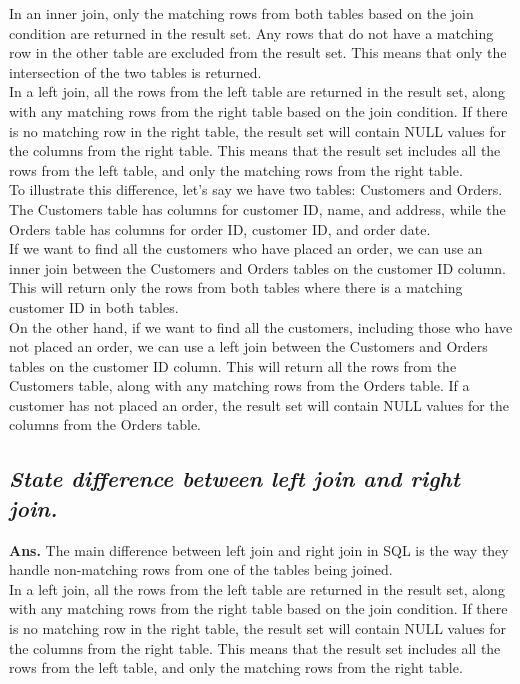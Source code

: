 \documentclass{article}
\begin{document}
In an inner join, only the matching rows from both tables based on the join condition are returned in the result set. Any rows that do not have a matching row in the other table are excluded from the result set. This means that only the intersection of the two tables is returned.\\

In a left join, all the rows from the left table are returned in the result set, along with any matching rows from the right table based on the join condition. If there is no matching row in the right table, the result set will contain NULL values for the columns from the right table. This means that the result set includes all the rows from the left table, and only the matching rows from the right table.\\

To illustrate this difference, let's say we have two tables: Customers and Orders. The Customers table has columns for customer ID, name, and address, while the Orders table has columns for order ID, customer ID, and order date.\\

If we want to find all the customers who have placed an order, we can use an inner join between the Customers and Orders tables on the customer ID column. This will return only the rows from both tables where there is a matching customer ID in both tables.\\

On the other hand, if we want to find all the customers, including those who have not placed an order, we can use a left join between the Customers and Orders tables on the customer ID column. This will return all the rows from the Customers table, along with any matching rows from the Orders table. If a customer has not placed an order, the result set will contain NULL values for the columns from the Orders table.
\subsection{\textit{State difference between left join and right join.}}
\textbf{Ans.} The main difference between left join and right join in SQL is the way they handle non-matching rows from one of the tables being joined.\\

In a left join, all the rows from the left table are returned in the result set, along with any matching rows from the right table based on the join condition. If there is no matching row in the right table, the result set will contain NULL values for the columns from the right table. This means that the result set includes all the rows from the left table, and only the matching rows from the right table.\\
\end{document}
